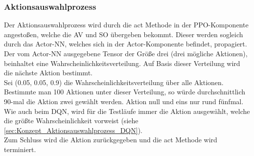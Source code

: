 \subsubsection{Aktionsauswahlprozess} \label{sec:Konzept_Aktionsauswahlprozess_PPO}
Der Aktionsauswahlprozess wird durch die act Methode in der PPO-Komponente angestoßen, welche die AV und SO übergeben bekommt. Dieser werden sogleich durch das Actor-NN, welches sich in der Actor-Komponente befindet, propagiert. Der vom Actor-NN ausgegebene Tensor der Größe drei (drei mögliche Aktionen), beinhaltet eine Wahrscheinlichkeitsverteilung. Auf Basis dieser Verteilung wird die nächste Aktion bestimmt.\\
Sei (0.05, 0.05, 0.9) die Wahrscheinlichkeitsverteilung über alle Aktionen. Bestimmte man 100 Aktionen unter dieser Verteilung, so würde durchschnittlich 90-mal die Aktion zwei gewählt werden. Aktion null und eins nur rund fünfmal.\\
Wie auch beim DQN, wird für die Testläufe immer die Aktion ausgewählt, welche die größte Wahrscheinlichkeit vorweist (siehe \ref{sec:Konzept_Aktionsauswahlprozess_DQN}).\\
Zum Schluss wird die Aktion zurückgegeben und die act Methode wird terminiert.

